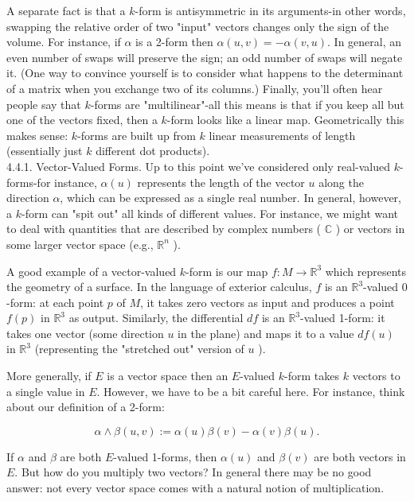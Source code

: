 \documentclass[10pt]{article}
\begin{document}
A separate fact is that a $k$-form is antisymmetric in its arguments-in other words, swapping the relative order of two "input" vectors changes only the sign of the volume. For instance, if $\alpha$ is a 2-form then $\alpha(u, v)=-\alpha(v, u)$. In general, an even number of swaps will preserve the sign; an odd number of swaps will negate it. (One way to convince yourself is to consider what happens to the determinant of a matrix when you exchange two of its columns.) Finally, you'll often hear people say that $k$-forms are "multilinear"-all this means is that if you keep all but one of the vectors fixed, then a $k$-form looks like a linear map. Geometrically this makes sense: $k$-forms are built up from $k$ linear measurements of length (essentially just $k$ different dot products).\\
4.4.1. Vector-Valued Forms. Up to this point we've considered only real-valued $k$-forms-for instance, $\alpha(u)$ represents the length of the vector $u$ along the direction $\alpha$, which can be expressed as a single real number. In general, however, a $k$-form can "spit out" all kinds of different values. For instance, we might want to deal with quantities that are described by complex numbers ( $\mathbb{C}$ ) or vectors in some larger vector space (e.g., $\mathbb{R}^{n}$ ).

A good example of a vector-valued $k$-form is our map $f: M \rightarrow \mathbb{R}^{3}$ which represents the geometry of a surface. In the language of exterior calculus, $f$ is an $\mathbb{R}^{3}$-valued 0 -form: at each point $p$ of $M$, it takes zero vectors as input and produces a point $f(p)$ in $\mathbb{R}^{3}$ as output. Similarly, the differential $d f$ is an $\mathbb{R}^{3}$-valued 1-form: it takes one vector (some direction $u$ in the plane) and maps it to a value $d f(u)$ in $\mathbb{R}^{3}$ (representing the "stretched out" version of $u$ ).

More generally, if $E$ is a vector space then an $E$-valued $k$-form takes $k$ vectors to a single value in $E$. However, we have to be a bit careful here. For instance, think about our definition of a 2-form:

$$
\alpha \wedge \beta(u, v):=\alpha(u) \beta(v)-\alpha(v) \beta(u) .
$$

If $\alpha$ and $\beta$ are both $E$-valued 1-forms, then $\alpha(u)$ and $\beta(v)$ are both vectors in $E$. But how do you multiply two vectors? In general there may be no good answer: not every vector space comes with a natural notion of multiplication.
\end{document}
